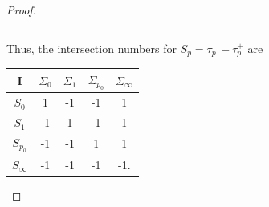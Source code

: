\documentclass[10pt,a4paper]{amsart}
\begin{document}
\begin{proof}
\begin{center}
\begin{tabular}{l c r}
\end{tabular}

\end{center}

Thus, the intersection numbers for $S_p = \tau_p^--\tau_p^+$ are 

\begin{center}

 \begin{tabular}{  c | c | c |c|c }
    I & $\Sigma_0$ & $\Sigma_1$ & $\Sigma_{p_0}$ & $\Sigma_\infty$ \\ \hline
    $S_0$ & 1 & -1 & -1 & 1\\ \hline
    $S_1$ & -1 & 1 & -1 & 1\\ \hline
    $S_{p_0}$ & -1 & -1  & 1 & 1\\ \hline
    $S_\infty$ & -1 & -1  & -1 & -1. \\
\end{tabular}

\end{center}

\end{proof}
\end{document}
